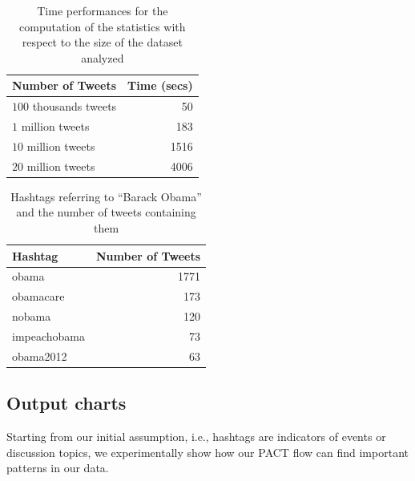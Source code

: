 \begin{table}[htb]
\centering 
\begin{tabular}{|l|r|}
\hline		
Number of Tweets			& Time (secs)\\
\hline
$100$ thousands tweets		&	50\\
$1$ million tweets		& 183\\
$10$ million tweets 		& 1516\\
$20$ million tweets 		& 4006\\  
\hline
\end{tabular}
\caption{Time performances for the computation of the statistics with respect to the size of the dataset analyzed}
\label{tbl:times}
\end{table}


\begin{table}[htb]
\centering 
\begin{tabular}{|l|r|}
\hline		
Hashtag			& Number of Tweets\\
\hline
obama		&	1771\\
obamacare		& 173\\
nobama 		& 120\\
impeachobama 		& 73\\  
obama2012 		& 63\\  
\hline
\end{tabular}
\caption{Hashtags referring to ``Barack Obama'' and the number of tweets containing them}
\label{tbl:obama-tweets}
\end{table}

\subsection{Output charts}
Starting from our initial assumption, i.e., hashtags  are indicators of events or discussion topics, we experimentally show how our PACT flow can find important patterns in our data.

